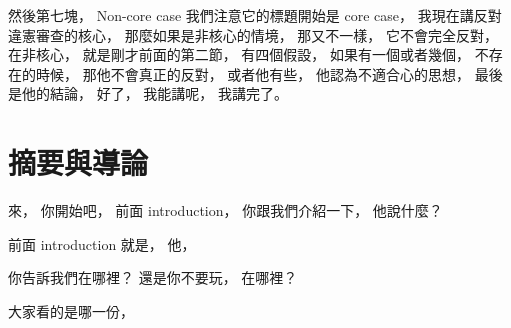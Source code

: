 \hypertarget{w06:cue:84}{}然後第七塊，
\hypertarget{w06:cue:85}{}Non-core case
\hypertarget{w06:cue:86}{}我們注意它的標題開始是 core case，
\hypertarget{w06:cue:87}{}我現在講反對違憲審查的核心，
\hypertarget{w06:cue:88}{}那麼如果是非核心的情境，
\hypertarget{w06:cue:89}{}那又不一樣，
\hypertarget{w06:cue:90}{}它不會完全反對，
\hypertarget{w06:cue:91}{}在非核心，
\hypertarget{w06:cue:92}{}就是剛才前面的第二節，
\hypertarget{w06:cue:93}{}有四個假設，
\hypertarget{w06:cue:94}{}如果有一個或者幾個，
\hypertarget{w06:cue:95}{}不存在的時候，
\hypertarget{w06:cue:96}{}那他不會真正的反對，
\hypertarget{w06:cue:97}{}或者他有些，
\hypertarget{w06:cue:98}{}他認為不適合心的思想，
\hypertarget{w06:cue:99}{}最後是他的結論，
\hypertarget{w06:cue:100}{}好了，
\hypertarget{w06:cue:101}{}我能講呢，
\hypertarget{w06:cue:102}{}我講完了。

\section{摘要與導論}

\hypertarget{w06:cue:103}{}來，
\hypertarget{w06:cue:104}{}你開始吧，
\hypertarget{w06:cue:105}{}前面 introduction，
\hypertarget{w06:cue:106}{}你跟我們介紹一下，
\hypertarget{w06:cue:107}{}他說什麼？

\hypertarget{w06:cue:108}{}前面 introduction 就是，
\hypertarget{w06:cue:109}{}他，

\hypertarget{w06:cue:110}{}你告訴我們在哪裡？
\hypertarget{w06:cue:111}{}還是你不要玩，
\hypertarget{w06:cue:112}{}在哪裡？

\hypertarget{w06:cue:113}{}大家看的是哪一份，

